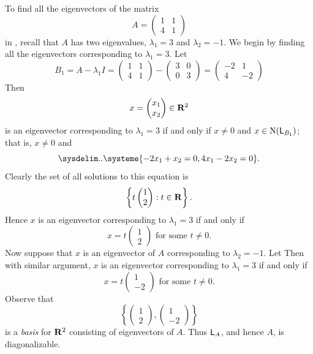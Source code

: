 \begin{example} \label{example 5.1.6}
To find all the eigenvectors of the matrix
\[
    A = \begin{pmatrix} 1 & 1 \\ 4 & 1 \end{pmatrix}
\]
in , recall that \(A\) has two eigenvalues, \(\lambda_1 = 3\) and \(\lambda_2 = -1\).
We begin by finding all the eigenvectors corresponding to \(\lambda_1 = 3\).
Let
\[
    B_{1}= A - \lambda_{1} I
    = \left(\begin{array}{ll}
        1 & 1 \\
        4 & 1
    \end{array}\right) - \left(\begin{array}{ll}
        3 & 0 \\
        0 & 3
    \end{array}\right)
    = \left(\begin{array}{rr}
        -2 & 1 \\
        4 & -2
    \end{array}\right)
\]
Then
\[
    x = \begin{pmatrix} x_1 \\ x_2 \end{pmatrix} \in \mathbf{R}^2
\]
is an eigenvector corresponding to \(\lambda_1 = 3\) if and only if \(x \ne 0\) and \(x \in \mathrm{N}(\textsf{L}_{B_1})\);
that is, \(x \ne 0\) and
\[
    \sysdelim..\systeme{
        -2 x_1 + x_2 = 0,
        4 x_1 - 2 x_2 = 0
    }.
\]
Clearly the set of all solutions to this equation is
\[
    \left\{ t \begin{pmatrix} 1 \\ 2 \end{pmatrix} : t \in \mathbf{R} \right\}.
\]
Hence \(x\) is an eigenvector corresponding to \(\lambda_1 = 3\) if and only if
\[
    x = t \begin{pmatrix} 1 \\ 2 \end{pmatrix} \text{ for some } t \ne 0.
\]
Now suppose that \(x\) is an eigenvector of \(A\) corresponding to \(\lambda_2 = -1\).
Let
Then with similar argument, \(x\) is an eigenvector corresponding to \(\lambda_1 = 3\) if and only if
\[
    x = t \begin{pmatrix} 1 \\ -2 \end{pmatrix} \text{ for some } t \ne 0.
\]
Observe that
\[
    \left\{ \begin{pmatrix} 1 \\ 2 \end{pmatrix}, \begin{pmatrix} 1 \\ -2 \end{pmatrix} \right\}
\]
is a \emph{basis} for \(\mathbf{R}^2\) consisting of eigenvectors of \(A\).
Thus \(\textsf{L}_A\), and hence \(A\), is diagonalizable.
\end{example}

